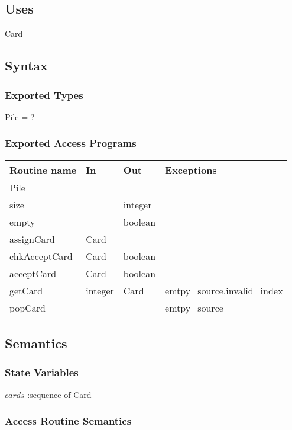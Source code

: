 \documentclass[12pt,fleqn]{article}
\begin{document}
\subsection* {Uses}

Card

\subsection* {Syntax}

\subsubsection* {Exported Types}

Pile = ?

\subsubsection* {Exported Access Programs}

\begin{tabular}{| l | l | l | l |}
\hline
\textbf{Routine name} & \textbf{In} & \textbf{Out} & \textbf{Exceptions}\\
\hline
Pile & ~ & ~ & ~\\
\hline
size & ~ & integer & ~\\
\hline
empty & ~ & boolean & ~\\
\hline
assignCard & Card & ~ & ~\\
\hline
chkAcceptCard & Card & boolean & ~\\
\hline
acceptCard & Card & boolean &  ~\\
\hline
getCard & integer & Card & emtpy\_source,invalid\_index\\
\hline
popCard & ~ & ~& emtpy\_source\\
\hline

\end{tabular}

\subsection* {Semantics}

\subsubsection* {State Variables}
$cards$ :sequence of Card

\subsubsection* {Access Routine Semantics}
\end{document}
